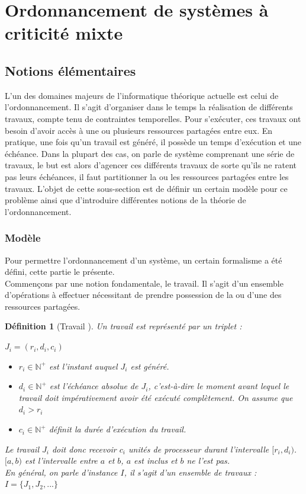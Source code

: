 \documentclass[12pt,a4paper,oneside]{book}
\theoremstyle{break}
\newtheorem{defin}{Définition}[chapter]
\theoremstyle{breakplain}
\begin{document}
\section{Ordonnancement de systèmes à criticité mixte}
\subsection{Notions élémentaires}
L'un des domaines majeurs de l'informatique théorique actuelle est celui de l'ordonnancement. Il s'agit d'organiser dans le temps la réalisation de différents travaux, compte tenu de contraintes temporelles. Pour s'exécuter, ces travaux ont besoin d'avoir accès à une ou plusieurs ressources partagées entre eux. En pratique, une fois qu'un travail est généré, il possède un temps d'exécution et une échéance. Dans la plupart des cas, on parle de système comprenant une série de travaux, le but est alors d'agencer ces différents travaux de sorte qu'ils ne ratent pas leurs échéances, il faut partitionner la ou les ressources partagées entre les travaux. L'objet de cette sous-section est de définir un certain modèle pour ce problème ainsi que d'introduire différentes notions de la théorie de l'ordonnancement.
\subsubsection{Modèle}
Pour permettre l'ordonnancement d'un système, un certain formalisme a été défini, cette partie le présente.\\

Commençons par une notion fondamentale, le travail. Il s'agit d'un ensemble d'opérations à effectuer nécessitant de prendre possession de la ou d'une des ressources partagées.

\begin{defin}[Travail \cite{goossens2014os}]
Un travail est représenté par un triplet : 
\begin{center}
$J_i = (r_i, d_i, c_i)$
\end{center}
\begin{itemize}
\item $r_i \in \mathbb{N}^{+}$ est l'instant auquel $J_i$ est généré.
\item $d_i \in \mathbb{N}^{+}$ est l'échéance absolue de $J_i$, c'est-à-dire le moment avant lequel le travail doit impérativement avoir été exécuté complètement. On assume que $d_i > r_i$
\item $c_i \in \mathbb{N}^{+}$ définit la durée d'exécution du travail.
\end{itemize}
Le travail $J_i$ doit donc recevoir $c_i$ unités de processeur durant l'intervalle $[r_i, d_i)$. $[a,b)$ est l'intervalle entre $a$ et $b$, $a$ est inclus et $b$ ne l'est pas. \\
En général, on parle d'instance $I$, il s'agit d'un ensemble de travaux : $ I = \{J_1, J_2, ...\} $
\end{defin}
\end{document}
